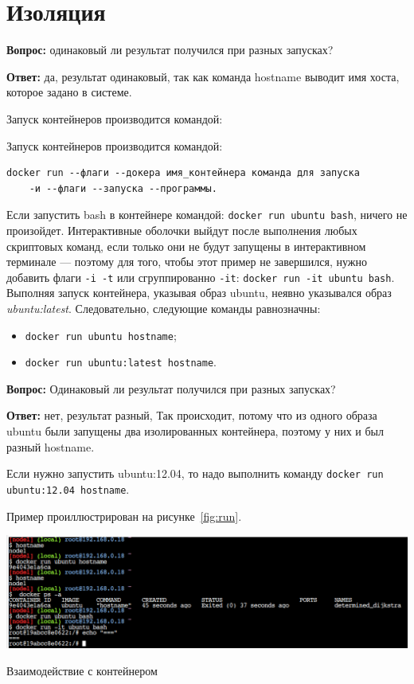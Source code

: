 \section{Изоляция}
\textbf{Вопрос:} одинаковый ли результат получился при разных запусках?\par
\textbf{Ответ:} да, результат одинаковый, так как команда hostname выводит имя
хоста, которое задано в системе.\par
Запуск контейнеров производится командой:

Запуск контейнеров производится командой:

\begin{verbatim}
docker run --флаги --докера имя_контейнера команда для запуска
	-и --флаги --запуска --программы.
\end{verbatim}

Если запустить bash в контейнере командой: \texttt{docker~run~ubuntu~bash},
ничего не произойдет. Интерактивные оболочки выйдут после
выполнения любых скриптовых команд, если только они не будут
запущены в интерактивном терминале --- поэтому для того, чтобы этот пример
не завершился, нужно добавить флаги \texttt{-i~-t}
или сгруппированно \texttt{-it}: \texttt{docker~run~-it~ubuntu~bash}.
Выполняя запуск контейнера, указывая образ ubuntu,
неявно указывался образ \textit{ubuntu:latest}.
Следовательно, следующие команды равнозначны:

\begin{itemize}
	\item \texttt{docker run ubuntu hostname};
	\item \texttt{docker run ubuntu:latest hostname}.
\end{itemize}

\textbf{Вопрос:} Одинаковый ли результат получился при разных запусках?\par
\textbf{Ответ:} нет, результат разный, Так происходит, потому что из одного
образа ubuntu были запущены два изолированных контейнера, поэтому у
них и был разный hostname.\par
Если нужно запустить ubuntu:12.04, то надо выполнить команду
\texttt{docker run ubuntu:12.04 hostname}.\par
Пример проиллюстрирован на рисунке~\ref{fig:run}.

\begin{image}
	\includegraphics[width=1\textwidth]{Screenshot from 2023-04-15 15-31-58}
	\caption{Взаимодействие с контейнером}
	\label{fig:run}
\end{image}

